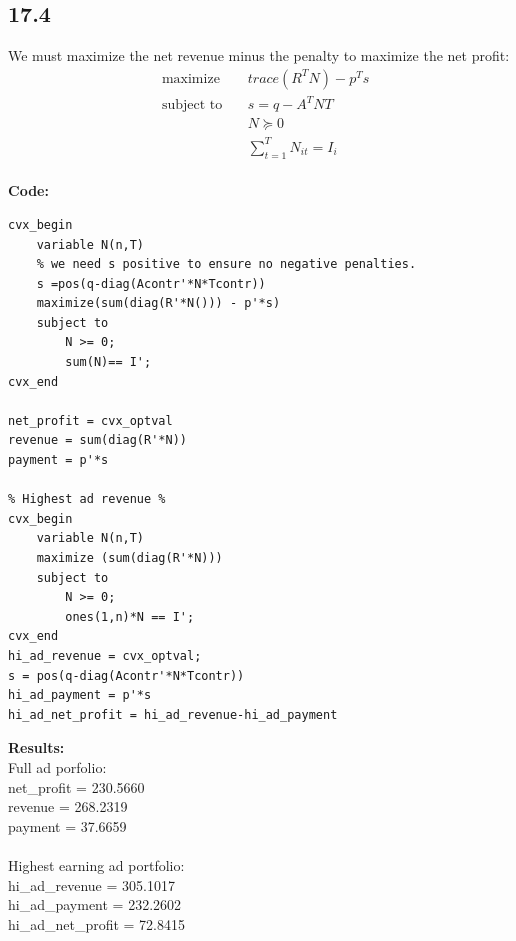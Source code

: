 \documentclass[12pt]{article}
\begin{document}
\subsection*{17.4}
We must maximize the net revenue minus the penalty to maximize the net profit:
\begin{equation*}
\begin{aligned}
& \underset{}{\text{maximize}}
& & trace(R^TN) - p^Ts\\
& \text{subject to}\
& & s = q - A^TNT\\
&&& N \succeq 0\\
&&& \sum_{t=1}^{T}N_{it} = I_{i}
\end{aligned}
\end{equation*}\\
\textbf{Code:}\\
\begin{lstlisting}
cvx_begin
    variable N(n,T)
    % we need s positive to ensure no negative penalties.
    s =pos(q-diag(Acontr'*N*Tcontr))
    maximize(sum(diag(R'*N())) - p'*s)
    subject to
        N >= 0;
        sum(N)== I';
cvx_end

net_profit = cvx_optval
revenue = sum(diag(R'*N))
payment = p'*s

% Highest ad revenue %
cvx_begin
    variable N(n,T)
    maximize (sum(diag(R'*N)))
    subject to
        N >= 0;
        ones(1,n)*N == I';
cvx_end
hi_ad_revenue = cvx_optval;
s = pos(q-diag(Acontr'*N*Tcontr))
hi_ad_payment = p'*s
hi_ad_net_profit = hi_ad_revenue-hi_ad_payment
\end{lstlisting}
\textbf{Results:}\\
Full ad porfolio:\\
net\_profit = 230.5660\\
revenue = 268.2319\\
payment = 37.6659\\\\
Highest earning ad portfolio:\\
hi\_ad\_revenue = 305.1017 \\
hi\_ad\_payment = 232.2602 \\
hi\_ad\_net\_profit = 72.8415 \\
\end{document}
